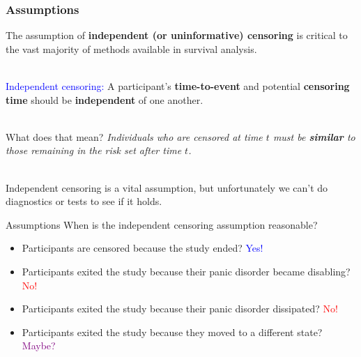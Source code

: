 \documentclass[10pt,t]{beamer}
\begin{document}
\begin{frame}
\frametitle{Assumptions}
The assumption of \textbf{independent (or uninformative) censoring} is critical to the vast majority of methods available in survival analysis.
\\ ~\ 

\textcolor{blue}{Independent censoring:} A participant's \textbf{time-to-event} and potential \textbf{censoring time} should be \textbf{independent} of one another.\pause 
\\ ~\ 

What does that mean? \pause \textit{Individuals who are censored at time $t$ must be \textbf{similar} to those remaining in the risk set after time $t$.}\pause 
\\ ~\ 

Independent censoring is a vital assumption, but unfortunately we can't do diagnostics or tests to see if it holds. 

\end{frame}

\begin{frame}{Assumptions}
	When is the independent censoring assumption reasonable? 
	\begin{itemize}
		\item Participants are censored because the study ended? \pause \textcolor{blue}{Yes!}
		\item Participants exited the study because their panic disorder became disabling? \pause \textcolor{red}{No!}
		\item Participants exited the study because their panic disorder dissipated? \pause \textcolor{red}{No!}
		\item Participants exited the study because they moved to a different state? \pause \textcolor{purple}{Maybe?}
	\end{itemize}

\end{frame}
\end{document}

